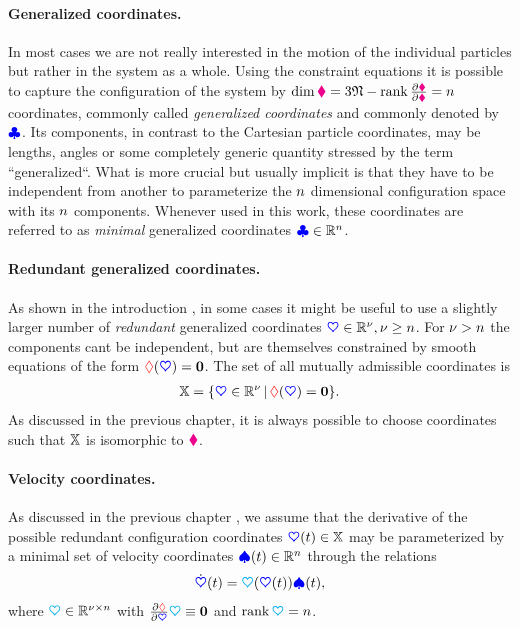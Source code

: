 \paragraph{Generalized coordinates.} 
In most cases we are not really interested in the motion of the individual particles but rather in the system as a whole.
Using the constraint equations it is possible to capture the configuration of the system by $\dim\particleConfigSpace = 3\numParticles - \rank\pdiff[\particleGeoConstraint]{\particleCoord} = \dimConfigSpace$ coordinates, commonly called \textit{generalized coordinates} and commonly denoted by $\genCoord$.
Its components, in contrast to the Cartesian particle coordinates, may be lengths, angles or some completely generic quantity stressed by the term ``generalized``.
What is more crucial but usually implicit is that they have to be independent from another to parameterize the $\dimConfigSpace$ dimensional configuration space with its $\dimConfigSpace$ components.
Whenever used in this work, these coordinates are referred to as \textit{minimal} generalized coordinates $\genCoord\in\RealNum^\dimConfigSpace$.

\paragraph{Redundant generalized coordinates.} 
As shown in the introduction \fixme{[link]}, in some cases it might be useful to use a slightly larger number of \textit{redundant} generalized coordinates $\sysCoord\in\RealNum^{\numCoord}, \numCoord\geq\dimConfigSpace$.
For $\numCoord>\dimConfigSpace$ the components cant be independent, but are themselves constrained by smooth equations of the form $\geoConstraint(\sysCoord)=\tuple{0}$.
The set of all mutually admissible coordinates is
\begin{align}
 \configSpace = \{ \sysCoord \in \RealNum^{\numCoord} \, | \, \geoConstraint(\sysCoord) = \tuple{0} \}. 
\end{align}
As discussed in the previous chapter, it is always possible to choose coordinates such that $\configSpace$ is isomorphic to $\particleConfigSpace$.

\paragraph{Velocity coordinates.}
As discussed in the previous chapter \fixme{[link]}, we assume that the derivative of the possible redundant configuration coordinates $\sysCoord(t)\in\configSpace$ may be parameterized by a minimal set of velocity coordinates $\sysVel(t)\in\RealNum^{\dimConfigSpace}$ through the relations
\begin{align}
 \sysCoordd(t) = \kinMat(\sysCoord(t)) \sysVel(t),
\end{align}
where $\kinMat\in\RealNum^{\numCoord\times\dimConfigSpace}$ with $\pdiff[\geoConstraint]{\sysCoord}\kinMat \equiv \mat{0}$ and $\rank\kinMat=\dimConfigSpace$.

